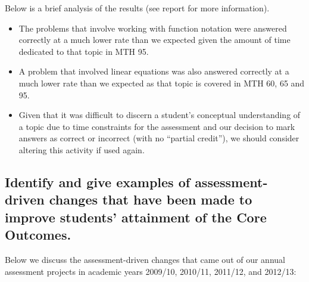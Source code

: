 \begin{description}
Below is a brief analysis of the results (see report for more information).
\begin{itemize}
\item The problems that involve working with function notation were answered correctly at a much lower rate than we expected given the amount of time dedicated to that topic in MTH 95.
\item A problem that involved linear equations was also answered correctly at a much lower rate than we expected as that topic is covered in MTH 60, 65 and 95.
\item Given that it was difficult to discern a student's conceptual understanding of a topic due to time constraints for the assessment and our decision to mark answers as correct or incorrect (with no ``partial credit''), we should consider altering this activity if used again.
\end{itemize}


\end{description}

\subsection{Identify and give examples of assessment-driven changes that have been made to improve students' attainment of the Core Outcomes.}

Below we discuss the assessment-driven changes that came out of our annual assessment projects in academic years 2009/10, 2010/11, 2011/12, and 2012/13:

